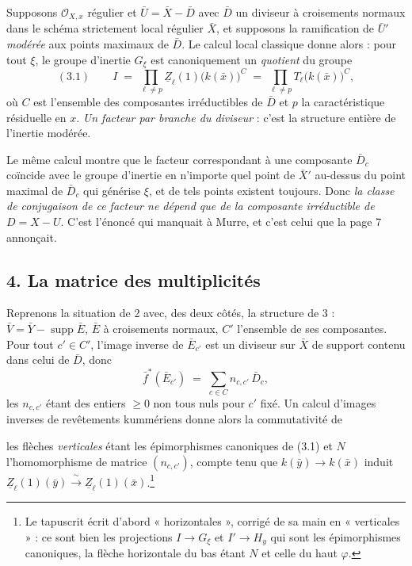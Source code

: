 \documentclass[11pt,a4paper]{article}
\begin{document}
Supposons $\mathcal{O}_{X,x}$ régulier et $\bar{U} = \bar{X} - \bar{D}$ avec
$\bar{D}$ un diviseur à croisements normaux dans le schéma strictement local
régulier $\bar{X}$, et supposons la ramification de $\bar{U}'$ \emph{modérée}
aux points maximaux de $\bar{D}$. Le calcul local classique donne alors : pour
tout $\xi$, le groupe d'inertie $G_{\xi}$ est canoniquement un \emph{quotient}
du groupe
\[
  (3.1) \qquad I \;=\; \prod_{\ell \neq p}
  \underline{Z}_{\ell}(1)\bigl(k(\bar{x})\bigr)^{C}
  \;=\; \prod_{\ell \neq p} T_{\ell}\bigl(k(\bar{x})\bigr)^{C} ,
\]
où $C$ est l'ensemble des composantes irréductibles de $\bar{D}$ et $p$ la
caractéristique résiduelle en $x$. \emph{Un facteur par branche du diviseur} :
c'est la structure entière de l'inertie modérée.

Le même calcul montre que le facteur correspondant à une composante
$\bar{D}_{c}$ coïncide avec le groupe d'inertie en n'importe quel point de
$\bar{X}'$ au-dessus du point maximal de $\bar{D}_{c}$ qui générise $\xi$,
et de tels points existent toujours. Donc \emph{la classe de conjugaison de ce
facteur ne dépend que de la composante irréductible de $D = X - U$}. C'est
l'énoncé qui manquait à Murre, et c'est celui que la page 7 annonçait.

\subsection*{4. La matrice des multiplicités}

Reprenons la situation de 2 avec, des deux côtés, la structure de 3 :
$\bar{V} = \bar{Y} - \operatorname{supp}\bar{E}$, $\bar{E}$ à croisements
normaux, $C'$ l'ensemble de ses composantes. Pour tout $c' \in C'$, l'image
inverse de $\bar{E}_{c'}$ est un diviseur sur $\bar{X}$ de support contenu dans
celui de $\bar{D}$, donc
\[
  \bar{f}^{*}(\bar{E}_{c'}) \;=\; \sum_{c \in C} n_{c,c'}\,\bar{D}_{c} ,
\]
les $n_{c,c'}$ étant des entiers $\geqslant 0$ non tous nuls pour $c'$ fixé.
Un calcul d'images inverses de revêtements kummériens donne alors la
commutativité de


les flèches \emph{verticales} étant les épimorphismes canoniques de (3.1) et
$N$ l'homomorphisme de matrice $(n_{c,c'})$, compte tenu que
$k(\bar{y}) \to k(\bar{x})$ induit
$\underline{Z}_{\ell}(1)(\bar{y}) \xrightarrow{\ \sim\ }
\underline{Z}_{\ell}(1)(\bar{x})$.\footnote{Le tapuscrit écrit d'abord
« horizontales », corrigé de sa main en « verticales » : ce sont bien les
projections $I \to G_{\xi}$ et $I' \to H_{y}$ qui sont les épimorphismes
canoniques, la flèche horizontale du bas étant $N$ et celle du haut $\varphi$.}
\end{document}
